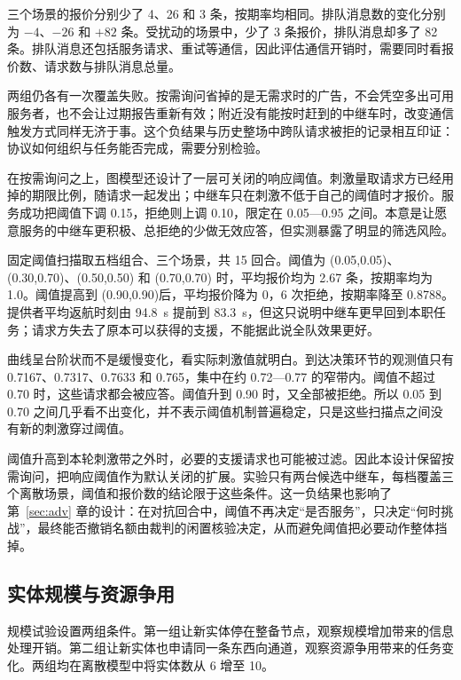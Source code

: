 三个场景的报价分别少了 4、26 和 3 条，按期率均相同。排队消息数的变化分别为 $-4$、$-26$ 和 $+82$ 条。受扰动的场景中，少了 3 条报价，排队消息却多了 82 条。排队消息还包括服务请求、重试等通信，因此评估通信开销时，需要同时看报价数、请求数与排队消息总量。

两组仍各有一次覆盖失败。按需询问省掉的是无需求时的广告，不会凭空多出可用服务者，也不会让过期报告重新有效；附近没有能按时赶到的中继车时，改变通信触发方式同样无济于事。这个负结果与历史整场中跨队请求被拒的记录相互印证：协议如何组织与任务能否完成，需要分别检验。

在按需询问之上，图模型还设计了一层可关闭的响应阈值。刺激量取请求方已经用掉的期限比例，随请求一起发出；中继车只在刺激不低于自己的阈值时才报价。服务成功把阈值下调 0.15，拒绝则上调 0.10，限定在 0.05—0.95 之间。本意是让愿意服务的中继车更积极、总拒绝的少做无效应答，但实测暴露了明显的筛选风险。

固定阈值扫描取五档组合、三个场景，共 15 回合。阈值为 (0.05,0.05)、(0.30,0.70)、(0.50,0.50) 和 (0.70,0.70) 时，平均报价均为 2.67 条，按期率均为 1.0。阈值提高到 (0.90,0.90)后，平均报价降为 0，6 次拒绝，按期率降至 0.8788。提供者平均返航时刻由 94.8~s 提前到 83.3~s，但这只说明中继车更早回到本职任务；请求方失去了原本可以获得的支援，不能据此说全队效果更好。


曲线呈台阶状而不是缓慢变化，看实际刺激值就明白。到达决策环节的观测值只有 0.7167、0.7317、0.7633 和 0.765，集中在约 0.72—0.77 的窄带内。阈值不超过 0.70 时，这些请求都会被应答。阈值升到 0.90 时，又全部被拒绝。所以 0.05 到 0.70 之间几乎看不出变化，并不表示阈值机制普遍稳定，只是这些扫描点之间没有新的刺激穿过阈值。

阈值升高到本轮刺激带之外时，必要的支援请求也可能被过滤。因此本设计保留按需询问，把响应阈值作为默认关闭的扩展。实验只有两台候选中继车，每档覆盖三个离散场景，阈值和报价数的结论限于这些条件。这一负结果也影响了第~\ref{sec:adv} 章的设计：在对抗回合中，阈值不再决定“是否服务”，只决定“何时挑战”，最终能否撤销名额由裁判的闲置核验决定，从而避免阈值把必要动作整体挡掉。

\subsection{实体规模与资源争用}\label{sec:6.2}

规模试验设置两组条件。第一组让新实体停在整备节点，观察规模增加带来的信息处理开销。第二组让新实体也申请同一条东西向通道，观察资源争用带来的任务变化。两组均在离散模型中将实体数从 6 增至 10。

